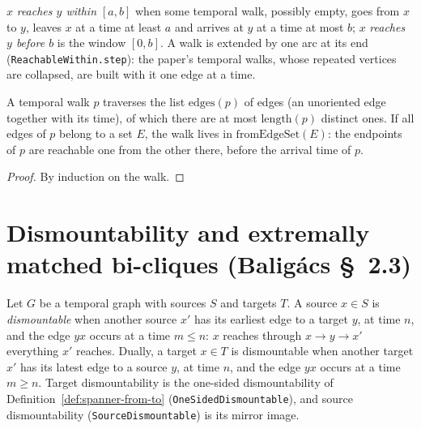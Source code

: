 \begin{definition}
  \label{def:reachable-within}
  \leanok
  $x$ \emph{reaches $y$ within $[a, b]$} when some temporal walk, possibly
  empty, goes from $x$ to $y$, leaves $x$ at a time at least $a$ and arrives at
  $y$ at a time at most $b$; $x$ \emph{reaches $y$ before $b$} is the window
  $[0, b]$. A walk is extended by one arc at its end
  (\texttt{ReachableWithin.step}): the paper's temporal walks, whose repeated
  vertices are collapsed, are built with it one edge at a time.
\end{definition}

\begin{lemma}
  \label{lem:walk-edges}
  \leanok
  A temporal walk $p$ traverses the list $\mathrm{edges}(p)$ of edges (an
  unoriented edge together with its time), of which there are at most
  $\mathrm{length}(p)$ distinct ones. If all edges of $p$ belong to a set $E$,
  the walk lives in $\mathrm{fromEdgeSet}(E)$: the endpoints of $p$ are
  reachable one from the other there, before the arrival time of $p$.
\end{lemma}

\begin{proof}
  \leanok
  By induction on the walk.
\end{proof}

\section*{Dismountability and extremally matched bi-cliques (Baligács \S~2.3)}

\begin{definition}
  \label{def:source-target-dismountable}
  \leanok
  Let $G$ be a temporal graph with sources $S$ and targets $T$. A source
  $x \in S$ is \emph{dismountable} when another source $x'$ has its earliest
  edge to a target $y$, at time $n$, and the edge $yx$ occurs at a time
  $m \le n$: $x$ reaches through $x \to y \to x'$ everything $x'$ reaches.
  Dually, a target $x \in T$ is dismountable when another target $x'$ has its
  latest edge to a source $y$, at time $n$, and the edge $yx$ occurs at a time
  $m \ge n$. Target dismountability is the one-sided dismountability of
  Definition~\ref{def:spanner-from-to}
  (\texttt{OneSidedDismountable}), and source dismountability
  (\texttt{SourceDismountable}) is its mirror image.
\end{definition}

